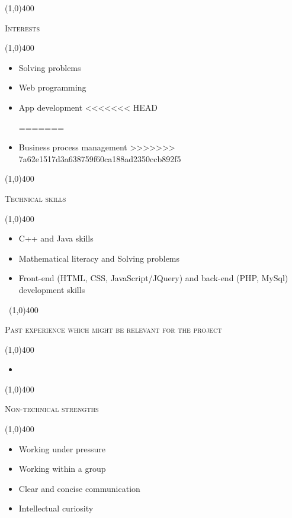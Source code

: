 \documentclass[12pt,a4paper]{report}
\begin{document}
\begin{center}
	
	\line(1,0){400}\\
	{\scshape\large Interests\par}
	\line(1,0){400}\\
	\end{center}
	\begin{itemize}
	\item 
		Solving problems
	\item 
		Web programming
	\item 
		App development
<<<<<<< HEAD
	
=======
	\item 
		Business process management
>>>>>>> 7a62e1517d3a638759f60ca188ad2350ccb892f5
	\end{itemize}
	
	\begin{center}
	
	\line(1,0){400}\\
	{\scshape\large Technical skills\par}
	\line(1,0){400}\\
	\end{center}
	\begin{itemize}
        \item 
             C++ and Java skills
        \item 
            Mathematical literacy and Solving problems
        \item  
            Front-end (HTML, CSS, JavaScript/JQuery) and back-end (PHP, MySql) development skills 
	\end{itemize}
\newpage
\begin{center}
	\vspace*{-3cm}\
	\line(1,0){400}\\
	{\scshape\large Past experience which might be relevant for the project\par}
	\line(1,0){400}\\
	\end{center}
		\begin{itemize}
\item 

\end{itemize}

	\begin{center}
	
	\line(1,0){400}\\
	{\scshape\large Non-technical strengths\par}
	\line(1,0){400}\\
	\end{center}
	\begin{itemize}
	\item 
		Working under pressure
	\item 
		Working within a group
	\item 
		Clear and concise communication
	\item 
		Intellectual curiosity
	\end{itemize}
\end{document}

